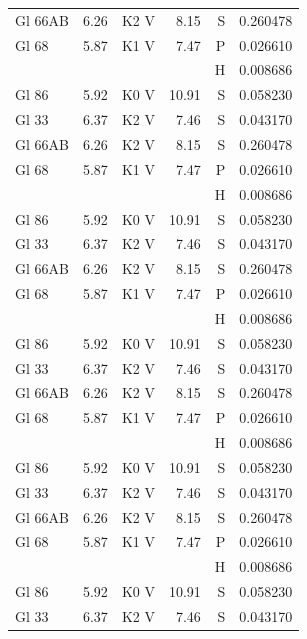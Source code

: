 \documentclass{aa}
\begin{document}
\begin{appendix}
\begin{landscape}
\begin{longtable}{lllrrr}
			Gl 66AB   & 6.26    & K2 V     & 8.15     & S    & 0.260478   \\
			Gl 68     & 5.87    & K1 V     & 7.47     & P    & 0.026610   \\
			          &         &          &          & H    & 0.008686   \\
			Gl 86     & 5.92    & K0 V     & 10.91    & S    & 0.058230   \\   Gl 33    & 6.37 & K2 V & 7.46 & S & 0.043170\\
			Gl 66AB   & 6.26    & K2 V     & 8.15     & S    & 0.260478   \\
			Gl 68     & 5.87    & K1 V     & 7.47     & P    & 0.026610   \\
			          &         &          &          & H    & 0.008686   \\
			Gl 86     & 5.92    & K0 V     & 10.91    & S    & 0.058230   \\   Gl 33    & 6.37 & K2 V & 7.46 & S & 0.043170\\
			Gl 66AB   & 6.26    & K2 V     & 8.15     & S    & 0.260478   \\
			Gl 68     & 5.87    & K1 V     & 7.47     & P    & 0.026610   \\
			          &         &          &          & H    & 0.008686   \\
			Gl 86     & 5.92    & K0 V     & 10.91    & S    & 0.058230   \\   Gl 33    & 6.37 & K2 V & 7.46 & S & 0.043170\\
			Gl 66AB   & 6.26    & K2 V     & 8.15     & S    & 0.260478   \\
			Gl 68     & 5.87    & K1 V     & 7.47     & P    & 0.026610   \\
			          &         &          &          & H    & 0.008686   \\
			Gl 86     & 5.92    & K0 V     & 10.91    & S    & 0.058230   \\   Gl 33    & 6.37 & K2 V & 7.46 & S & 0.043170\\
			Gl 66AB   & 6.26    & K2 V     & 8.15     & S    & 0.260478   \\
			Gl 68     & 5.87    & K1 V     & 7.47     & P    & 0.026610   \\
			          &         &          &          & H    & 0.008686   \\
			Gl 86     & 5.92    & K0 V     & 10.91    & S    & 0.058230   \\   Gl 33    & 6.37 & K2 V & 7.46 & S & 0.043170\\

\end{longtable}
\end{landscape}
\end{appendix}
\end{document}
